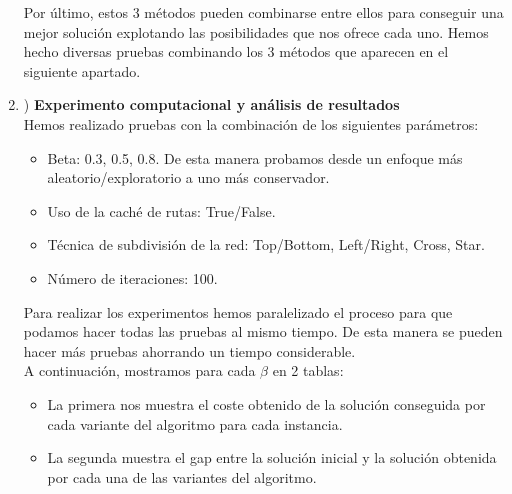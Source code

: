 \documentclass[11pt]{article} %
\begin{document}
\begin{enumerate}
Por último, estos 3 métodos pueden combinarse entre ellos para conseguir una mejor solución explotando las posibilidades que nos ofrece cada uno. Hemos hecho diversas pruebas combinando los 3 métodos que aparecen en el siguiente apartado.

\clearpage

   \item) \textbf{Experimento computacional y análisis de resultados}\\[0.2cm]

Hemos realizado pruebas con la combinación de los siguientes parámetros:
\begin{itemize}
\item Beta: 0.3, 0.5, 0.8. De esta manera probamos desde un enfoque más aleatorio/exploratorio a uno más conservador.
\item Uso de la caché de rutas: True/False.
\item Técnica de subdivisión de la red: Top/Bottom, Left/Right, Cross, Star. 
\item Número de iteraciones: 100.
\end{itemize}

Para realizar los experimentos hemos paralelizado el proceso para que podamos hacer todas las pruebas al mismo tiempo. De esta manera se pueden hacer más pruebas ahorrando un tiempo considerable.\\
A continuación, mostramos para cada $\beta$ en 2 tablas: 
\begin{itemize}
\item La primera nos muestra el coste obtenido de la solución conseguida por cada variante del algoritmo para cada instancia.
\item La segunda muestra el gap entre la solución inicial y la solución obtenida por cada una de las variantes del algoritmo.
\end{itemize}


\end{enumerate}
\end{document}
